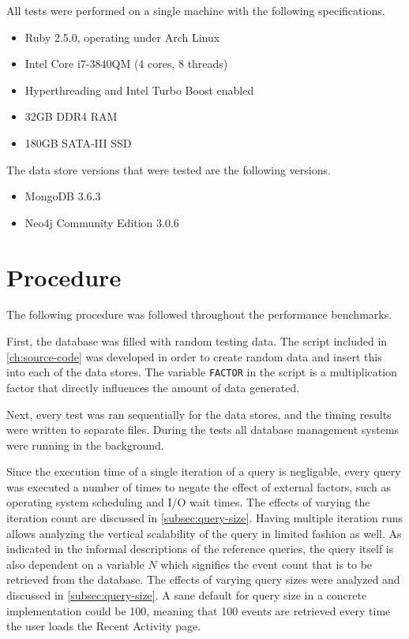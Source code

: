 All tests were performed on a single machine with the following specifications.

\begin{itemize}
  \item Ruby 2.5.0, operating under Arch Linux
  \item Intel Core i7-3840QM (4 cores, 8 threads)
  \item Hyperthreading and Intel Turbo Boost enabled
  \item 32GB DDR4 RAM
  \item 180GB SATA-III SSD
\end{itemize}

The data store versions that were tested are the following versions.

\begin{itemize}
  \item MongoDB 3.6.3
  \item Neo4j Community Edition 3.0.6
\end{itemize}

\section{Procedure}
\label{sec:procedure}

The following procedure was followed throughout the performance benchmarks.

First, the database was filled with random testing data.
The script included in \cref{ch:source-code} was developed in order to create random data and insert this into each of the data stores.
The variable \texttt{FACTOR} in the script is a multiplication factor that directly influences the amount of data generated.

Next, every test was ran sequentially for the data stores, and the timing results were written to separate files.
During the tests all database management systems were running in the background.

Since the execution time of a single iteration of a query is negligable, every query was executed a number of times to negate the effect of external factors, such as operating system scheduling and I/O wait times.
The effects of varying the iteration count are discussed in \cref{subsec:query-size}.
Having multiple iteration runs allows analyzing the vertical scalability of the query in limited fashion as well.
As indicated in the informal descriptions of the reference queries, the query itself is also dependent on a variable $N$ which signifies the event count that is to be retrieved from the database.
The effects of varying query sizes were analyzed and discussed in \cref{subsec:query-size}.
A sane default for query size in a concrete implementation could be 100, meaning that 100 events are retrieved every time the user loads the Recent Activity page.

